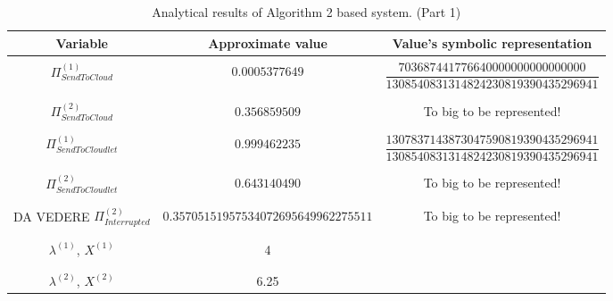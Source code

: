 \documentclass[10pt,a4paper]{article}
\begin{document}
\begin{table}[h!]
\caption{Analytical results of Algorithm 2 based system. (Part 1)}
\begin{adjustbox}{center=\textwidth}
	
     \begin{tabular}{c|c|c}
     \toprule
     \textbf{Variable} & \textbf{Approximate value} & \textbf{Value's symbolic representation} \\
     \toprule
	 
	 &&\\
	  
	 
	 $\Pi_{SendToCloud}^{(1)}$ & $0.0005377649$ & $\dfrac{703687441776640000000000000000}{1308540831314824230819390435296941}$  \\
	 
	 &&\\\hline &&\\	 
	 
	 $\Pi_{SendToCloud}^{(2)}$ & $0.356859509$ & To big to be represented! \\
	 
	 &&\\\hline &&\\
	 
	 $\Pi_{SendToCloudlet}^{(1)}$ & $0.999462235$ &  $\dfrac{1307837143873047590819390435296941}{1308540831314824230819390435296941}$  \\
	 
	 &&\\\hline &&\\
	 
	 $\Pi_{SendToCloudlet}^{(2)}$ & $0.643140490$ & To big to be represented! \\
	 
	 &&\\\hline &&\\
	 
	 DA VEDERE $\Pi_{Interrupted}^{(2)}$ & $0.35705151957534072695649962275511$ & To big to be represented! \\
	 
     &&\\\hline &&\\

	 $\lambda^{(1)}$, $X^{(1)}$ & 4 & \\
	 
	 &&\\\hline &&\\

	 $\lambda^{(2)}$, $X^{(2)}$ & 6.25 & \\
	 

\end{tabular}
\end{adjustbox}
\end{table}
\end{document}
